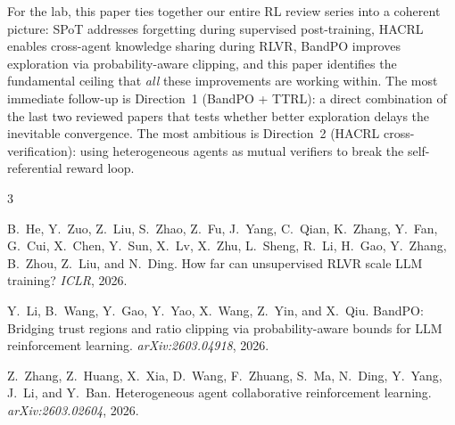\documentclass[11pt]{article}
\begin{document}
For the lab, this paper ties together our entire RL review series into a coherent picture: SPoT addresses forgetting during supervised post-training, HACRL enables cross-agent knowledge sharing during RLVR, BandPO improves exploration via probability-aware clipping, and this paper identifies the fundamental ceiling that \emph{all} these improvements are working within. The most immediate follow-up is Direction~1 (BandPO + TTRL): a direct combination of the last two reviewed papers that tests whether better exploration delays the inevitable convergence. The most ambitious is Direction~2 (HACRL cross-verification): using heterogeneous agents as mutual verifiers to break the self-referential reward loop.


\begin{thebibliography}{3}

B.~He, Y.~Zuo, Z.~Liu, S.~Zhao, Z.~Fu, J.~Yang, C.~Qian, K.~Zhang, Y.~Fan, G.~Cui, X.~Chen, Y.~Sun, X.~Lv, X.~Zhu, L.~Sheng, R.~Li, H.~Gao, Y.~Zhang, B.~Zhou, Z.~Liu, and N.~Ding.
\newblock How far can unsupervised RLVR scale LLM training?
\newblock \emph{ICLR}, 2026.

Y.~Li, B.~Wang, Y.~Gao, Y.~Yao, X.~Wang, Z.~Yin, and X.~Qiu.
\newblock BandPO: Bridging trust regions and ratio clipping via probability-aware bounds for LLM reinforcement learning.
\newblock \emph{arXiv:2603.04918}, 2026.

Z.~Zhang, Z.~Huang, X.~Xia, D.~Wang, F.~Zhuang, S.~Ma, N.~Ding, Y.~Yang, J.~Li, and Y.~Ban.
\newblock Heterogeneous agent collaborative reinforcement learning.
\newblock \emph{arXiv:2603.02604}, 2026.

\end{thebibliography}
\end{document}
